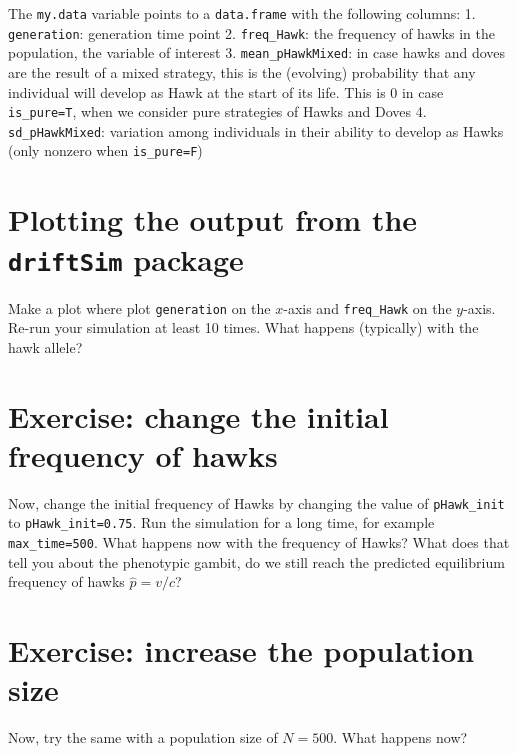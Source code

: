 \documentclass[
]{book}
\begin{document}
The \texttt{my.data} variable points to a \texttt{data.frame} with the following columns:
1. \texttt{generation}: generation time point
2. \texttt{freq\_Hawk}: the frequency of hawks in the population, the variable of interest
3. \texttt{mean\_pHawkMixed}: in case hawks and doves are the result of a mixed strategy, this is the (evolving) probability that any individual will develop as Hawk at the start of its life. This is 0 in case \texttt{is\_pure=T}, when we consider pure strategies of Hawks and Doves
4. \texttt{sd\_pHawkMixed}: variation among individuals in their ability to develop as Hawks (only nonzero when \texttt{is\_pure=F})

\hypertarget{plotting-the-output-from-the-driftsim-package}{%
\section{\texorpdfstring{Plotting the output from the \texttt{driftSim} package}{Plotting the output from the driftSim package}}\label{plotting-the-output-from-the-driftsim-package}}

Make a plot where plot \texttt{generation} on the \(x\)-axis and \texttt{freq\_Hawk} on the \(y\)-axis. Re-run your simulation at least 10 times. What happens (typically) with the hawk allele?

\hypertarget{exercise-change-the-initial-frequency-of-hawks}{%
\section{Exercise: change the initial frequency of hawks}\label{exercise-change-the-initial-frequency-of-hawks}}

Now, change the initial frequency of Hawks by changing the value of \texttt{pHawk\_init} to \texttt{pHawk\_init=0.75}. Run the simulation for a long time, for example \texttt{max\_time=500}. What happens now with the frequency of Hawks? What does that tell you about the phenotypic gambit, do we still reach the predicted equilibrium frequency of hawks \(\hat{p} = v/c\)?

\hypertarget{exercise-increase-the-population-size}{%
\section{Exercise: increase the population size}\label{exercise-increase-the-population-size}}

Now, try the same with a population size of \(N=500\). What happens now?
\end{document}
